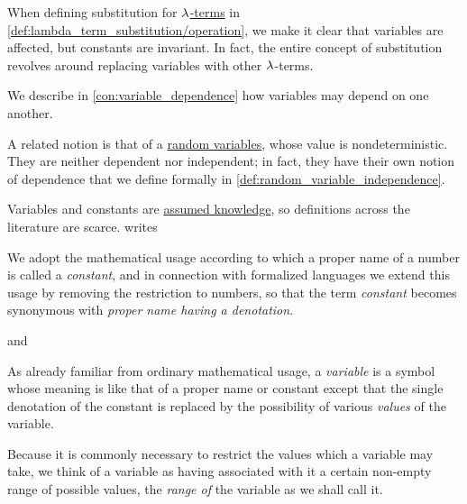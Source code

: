 \begin{comments}
  \item When defining substitution for \hyperref[def:lambda_term]{\( {\mathrm \lambda} \)-terms} in \cref{def:lambda_term_substitution/operation}, we make it clear that variables are affected, but constants are invariant. In fact, the entire concept of substitution revolves around replacing variables with other \( {\mathrm \lambda} \)-terms.

  \item We describe in \cref{con:variable_dependence} how variables may depend on one another.

  \item A related notion is that of a \hyperref[def:random_variable]{random variables}, whose value is nondeterministic. They are neither dependent nor independent; in fact, they have their own notion of dependence that we define formally in \cref{def:random_variable_independence}.

  \item Variables and constants are \hyperref[con:assumed_knowledge]{assumed knowledge}, so definitions across the literature are scarce.  writes
  \begin{displayquote}
    We adopt the mathematical usage according to which a proper name of a number is called a \textit{constant}, and in connection with formalized languages we extend this usage by removing the restriction to numbers, so that the term \textit{constant} becomes synonymous with \textit{proper name having a denotation}.
  \end{displayquote}
  and
  \begin{displayquote}
    As already familiar from ordinary mathematical usage, a \textit{variable} is a symbol whose meaning is like that of a proper name or constant except that the single denotation of the constant is replaced by the possibility of various \textit{values} of the variable.

    Because it is commonly necessary to restrict the values which a variable may take, we think of a variable as having associated with it a certain non-empty range of possible values, the \textit{range of} the variable as we shall call it.
  \end{displayquote}
\end{comments}

